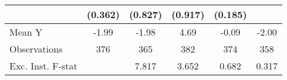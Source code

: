 {\begin{tabular}{l*{5}{c}}
            &     (0.362)         &     (0.827)         &     (0.917)         &     (0.185)         &                     \\
\midrule
Mean Y      &       -1.99         &       -1.98         &        4.69         &       -0.09         &       -2.00         \\
Observations&         376         &         365         &         382         &         374         &         358         \\
Exc. Inst. F-stat&                     &       7.817         &       3.652         &       0.682         &       0.317         \\
\bottomrule
\end{tabular}
}
